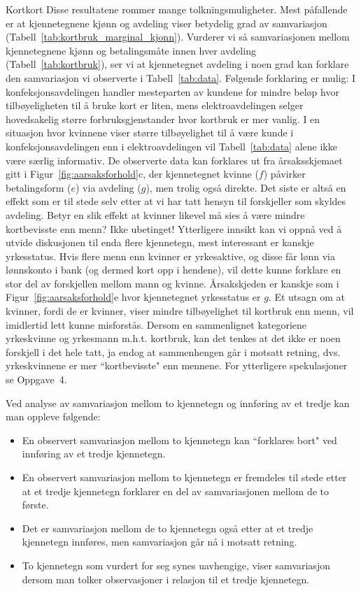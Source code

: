\begin{eksempel}{Kortkort}
Disse resultatene rommer mange tolkningsmuligheter.  Mest 
påfallende er at kjennetegnene kjønn og avdeling viser betydelig 
grad av samvariasjon (Tabell~\ref{tab:kortbruk_marginal_kjonn}).  Vurderer vi så samvariasjonen
mellom kjennetegnene kjønn og betalingsmåte innen hver avdeling
(Tabell~\ref{tab:kortbruk}), ser vi at kjennetegnet avdeling  i noen grad kan forklare
den samvariasjon vi observerte i Tabell~\ref{tab:data}.  Følgende forklaring er
mulig:  I konfeksjonsavdelingen handler mesteparten av kundene for mindre
beløp hvor tilbøyeligheten til å bruke kort er liten, mens 
elektroavdelingen selger hovedsakelig større for\-bruks\-gjen\-stander
hvor kortbruk er mer vanlig.  I en situasjon hvor kvinnene viser større
tilbøyelighet til å være kunde i konfeksjonsavdelingen enn i
elektroavdelingen vil Tabell~\ref{tab:data} alene ikke være særlig
informativ.  De observerte data kan forklares ut fra årsaksskjemaet
gitt i Figur~\ref{fig:aarsaksforhold}c, der kjennetegnet kvinne ($f$) påvirker betalingsform
($e$) via avdeling ($g$), men trolig også direkte.  Det siste er 
altså en effekt som er til stede selv etter at vi har tatt hensyn
til forskjeller som skyldes avdeling.  Betyr en slik effekt at kvinner
likevel må sies å være mindre kortbevisste enn menn?  Ikke
ubetinget!  Ytterligere innsikt kan vi oppnå ved å utvide
diskusjonen til enda flere kjennetegn, mest interessant er kanskje
yrkesstatus.  Hvis flere menn enn kvinner er yrkesaktive,
og disse får lønn via lønnskonto i bank (og dermed kort
 opp i hendene), vil dette kunne forklare en stor del av forskjellen
mellom mann og kvinne. Årsakskjeden er kanskje som i Figur~\ref{fig:aarsaksforhold}e hvor 
kjennetegnet yrkesstatus er $g$.  Et utsagn om at kvinner, fordi de er
kvinner, viser mindre tilbøyelighet til kortbruk enn menn, vil
imidlertid lett kunne misforstås.  Dersom en sammenlignet kategoriene
yrkeskvinne og yrkesmann m.h.t. kortbruk, kan det tenkes at det ikke
er noen forskjell i det hele tatt, ja endog at sammenhengen går i
motsatt retning, dvs. yrkeskvinnene er mer ``kortbevisste" enn mennene.
For ytterligere spekulasjoner se Oppgave~4.
\end{eksempel}

Ved analyse av samvariasjon mellom to kjennetegn og innføring av et
tredje kan man oppleve følgende:

\begin{itemize}
\item En observert samvariasjon mellom to kjennetegn kan ``forklares bort"
      ved innføring av et tredje kjennetegn.
\item En observert samvariasjon mellom to kjennetegn er fremdeles til
      stede etter at et tredje kjennetegn forklarer en del av 
      samvariasjonen mellom de to første.
\item Det er samvariasjon mellom de to kjennetegn også etter at et 
      tredje kjennetegn innføres, men samvariasjon går nå i
      motsatt retning.
\item To kjennetegn som vurdert for seg synes uavhengige, viser sam\-varia\-sjon
      dersom man tolker observasjoner i relasjon til et tredje kjennetegn.
\end{itemize}

